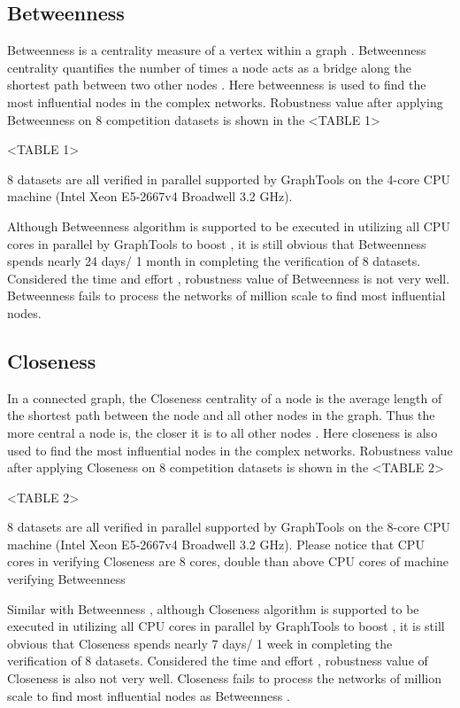 \documentclass{article}
\begin{document}
	\subsection{Betweenness}
	
	Betweenness is a centrality measure of a vertex within a graph . Betweenness centrality quantifies the number of times a node acts as a bridge along the shortest path between two other nodes \cite{wikiBetweennesscentrality}\cite{freeman1977set}. Here betweenness is used to find the most influential nodes in the complex networks. Robustness value after applying Betweenness on 8 competition datasets is shown in the <TABLE 1>
	
	<TABLE 1>
	
	8 datasets are all verified in parallel supported by GraphTools \cite{peixotographtool2014} on the 4-core CPU machine (Intel Xeon E5-2667v4 Broadwell 3.2 GHz). 
	
	Although Betweenness algorithm is supported to be executed in utilizing all CPU cores in parallel by GraphTools \cite{peixotographtool2014} to boost , it is still obvious that Betweenness spends nearly 24 days/ 1 month in completing the verification of 8 datasets. Considered the time and effort , robustness value of Betweenness is not very well. Betweenness fails to process the networks of million scale to find most influential nodes.
	
	\subsection{Closeness}	
	
	
	In a connected graph, the Closeness centrality of a node is the average length of the shortest path between the node and all other nodes in the graph. Thus the more central a node is, the closer it is to all other nodes \cite{wikiClosenesscentrality}\cite{bavelas1950communication} . Here closeness is also used to find the most influential nodes in the complex networks. Robustness value after applying Closeness on 8 competition datasets is shown in the <TABLE 2>
	
	<TABLE 2>
	
	8 datasets are all verified in parallel supported by GraphTools \cite{peixotographtool2014} on the 8-core CPU machine (Intel Xeon E5-2667v4 Broadwell 3.2 GHz). Please notice that CPU cores in verifying Closeness are 8 cores, double than above CPU cores of machine verifying Betweenness
	
	Similar with Betweenness , although Closeness algorithm is supported to be executed in utilizing all CPU cores in parallel by GraphTools to boost , it is still obvious that Closeness spends nearly 7 days/ 1 week in completing the verification of 8 datasets. Considered the time and effort , robustness value of Closeness is also not very well. Closeness fails to process the networks of million scale to find most influential nodes as Betweenness .
	
\end{document}
